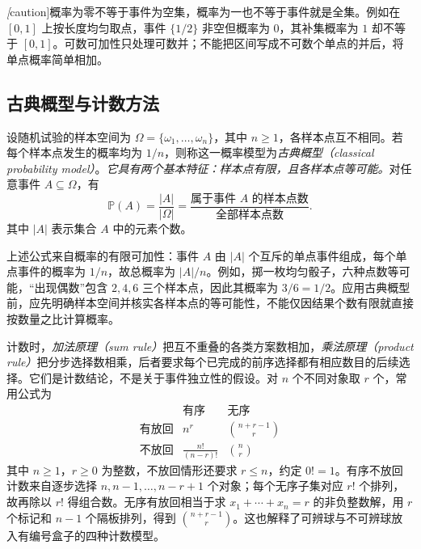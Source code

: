 \emph[caution]{概率为零不等于事件为空集，概率为一也不等于事件就是全集。}例如在 $[0,1]$ 上按长度均匀取点，事件 $\{1/2\}$ 非空但概率为 $0$，其补集概率为 $1$ 却不等于 $[0,1]$。可数可加性只处理可数并；不能把区间写成不可数个单点的并后，将单点概率简单相加。

\subsection{古典概型与计数方法}
\label{subsec:study-classical-counting}

\begin{definition}
\label{def:study-classical-probability}
设随机试验的样本空间为 $\Omega=\{\omega_1,\ldots,\omega_n\}$，其中 $n\ge1$，各样本点互不相同。若每个样本点发生的概率均为 $1/n$，则称这一概率模型为\emph{古典概型（classical probability model）}。\emph{它具有两个基本特征：样本点有限，且各样本点等可能。}对任意事件 $A\subseteq\Omega$，有
\begin{equation}
  \mathbb P(A)=\frac{|A|}{|\Omega|}
  =\frac{\text{属于事件 }A\text{ 的样本点数}}{\text{全部样本点数}}.
  \label{eq:study-classical-probability}
\end{equation}
其中 $|A|$ 表示集合 $A$ 中的元素个数。
\end{definition}

上述公式来自概率的有限可加性：事件 $A$ 由 $|A|$ 个互斥的单点事件组成，每个单点事件的概率为 $1/n$，故总概率为 $|A|/n$。例如，掷一枚均匀骰子，六种点数等可能，“出现偶数”包含 $2,4,6$ 三个样本点，因此其概率为 $3/6=1/2$。应用古典概型前，应先明确样本空间并核实各样本点的等可能性，不能仅因结果个数有限就直接按数量之比计算概率。

计数时，\emph{加法原理（sum rule）}把互不重叠的各类方案数相加，\emph{乘法原理（product rule）}把分步选择数相乘，后者要求每个已完成的前序选择都有相应数目的后续选择。它们是计数结论，不是关于事件独立性的假设。对 $n$ 个不同对象取 $r$ 个，常用公式为
\begin{equation}
 \begin{array}{c|cc}
  &\text{有序}&\text{无序}\\ \hline
  \text{有放回}&n^r&\displaystyle\binom{n+r-1}{r}\\
  \text{不放回}&\displaystyle\frac{n!}{(n-r)!}&\displaystyle\binom nr
 \end{array}
 \label{eq:study-counting-formulas}
\end{equation}
其中 $n\ge1$，$r\ge0$ 为整数，不放回情形还要求 $r\le n$，约定 $0!=1$。有序不放回计数来自逐步选择 $n,n-1,\ldots,n-r+1$ 个对象；每个无序子集对应 $r!$ 个排列，故再除以 $r!$ 得组合数。无序有放回相当于求 $x_1+\cdots+x_n=r$ 的非负整数解，用 $r$ 个标记和 $n-1$ 个隔板排列，得到 $\binom{n+r-1}{r}$。这也解释了可辨球与不可辨球放入有编号盒子的四种计数模型。

